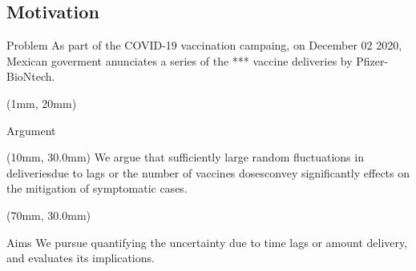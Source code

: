 \subsection{Motivation}
    \begin{frame}{Problem}
        As part of the COVID-19 vaccination campaing, on December 02
        2020, Mexican goverment anunciates a series of the ***
        vaccine deliveries by Pfizer-BioNtech.
        \begin{textblock*}{130mm}(1mm, 20mm)
    \end{textblock*}
    \end{frame}
%
\begin{frame}{Argument}
    \begin{textblock*}{50mm}(10mm, 30.0mm)
            We argue that sufficiently large random fluctuations in
        deliveries\textemdash due to lags or the
        number of vaccines doses\textemdash convey significantly
        effects on the mitigation of
        symptomatic cases.
\end{textblock*}

    \begin{textblock*}{50mm}(70mm, 30.0mm)
    \begin{block}{Aims}
        We pursue quantifying the uncertainty due to time lags or amount
        delivery, and evaluates its implications.
    \end{block}
    \end{textblock*}
\end{frame}

